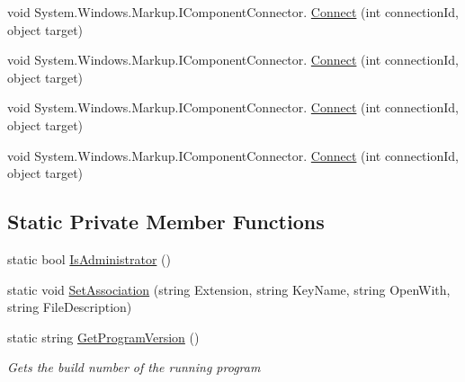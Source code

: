 \begin{DoxyCompactItemize}
$$void System.\+Windows.\+Markup.\+I\+Component\+Connector. \hyperlink{class_c_p_u___o_s___simulator_1_1_main_window_ae66177a5319cf24975b9dfab71bc830e}{Connect} (int connection\+Id, object target)
\item 
void System.\+Windows.\+Markup.\+I\+Component\+Connector. \hyperlink{class_c_p_u___o_s___simulator_1_1_main_window_ae66177a5319cf24975b9dfab71bc830e}{Connect} (int connection\+Id, object target)
\item 
void System.\+Windows.\+Markup.\+I\+Component\+Connector. \hyperlink{class_c_p_u___o_s___simulator_1_1_main_window_ae66177a5319cf24975b9dfab71bc830e}{Connect} (int connection\+Id, object target)
\item 
void System.\+Windows.\+Markup.\+I\+Component\+Connector. \hyperlink{class_c_p_u___o_s___simulator_1_1_main_window_ae66177a5319cf24975b9dfab71bc830e}{Connect} (int connection\+Id, object target)
\end{DoxyCompactItemize}
\subsection*{Static Private Member Functions}
\begin{DoxyCompactItemize}
\item 
static bool \hyperlink{class_c_p_u___o_s___simulator_1_1_main_window_ac84f58171f511e299566cb11c3a53e48}{Is\+Administrator} ()
\item 
static void \hyperlink{class_c_p_u___o_s___simulator_1_1_main_window_ac2d9309ba55c536660c9b98dff7e40b1}{Set\+Association} (string Extension, string Key\+Name, string Open\+With, string File\+Description)
\item 
static string \hyperlink{class_c_p_u___o_s___simulator_1_1_main_window_a4871bf311e6341a2339deff4ad6c2648}{Get\+Program\+Version} ()
\begin{DoxyCompactList}\small\item\em Gets the build number of the running program \end{DoxyCompactList}\end{DoxyCompactItemize}
